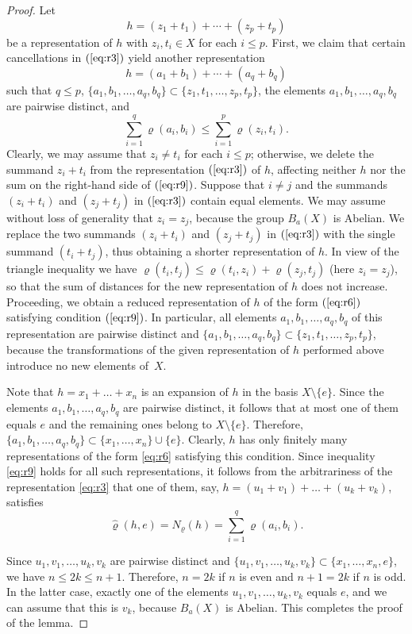 \documentclass[a4paper,12pt]{amsart}
\def\sub{\subset}
\theoremstyle{definition}
\begin{document}
\begin{proof}
Let 
\begin{equation}
\label{eq:r3}
h = (z_1+t_1) + \cdots + (z_p+t_p)
\end{equation}
be a representation of $h$ with $z_i,t_i\in X$ for each $i\leq p$.
First, we claim that certain cancellations in $(\ref{eq:r3})$ yield another 
representation 
\begin{equation}
\label{eq:r6}
h = (a_1+b_1) + \cdots + (a_q+b_q)
\end{equation}
such that $q\leq p$, $\{a_1,b_1,\ldots,a_q,b_q\}\sub 
\{z_1,t_1,\ldots,z_p,t_p\}$, the elements $a_1,b_1,\ldots,a_q,b_q$
are pairwise distinct, and 
\begin{equation}
\label{eq:r9}
\sum_{i=1}^q \varrho(a_i,b_i)\leq 
\sum_{i=1}^p \varrho(z_i,t_i).
\end{equation}
Clearly, we may assume that $z_i\neq t_i$ for each $i\leq p$; otherwise,
we delete the summand $z_i+t_i$ from the representation $(\ref{eq:r3})$
of $h$, affecting neither $h$ nor the sum on the right-hand side of 
$(\ref{eq:r9})$. Suppose that $i\ne j$ and the summands $(z_i+t_i)$
and $(z_j+t_j)$ in $(\ref{eq:r3})$ contain equal elements. We may assume 
without loss of generality that $z_i=z_j$, because the group $B_a(X)$ is 
Abelian. We replace the two summands $(z_i+t_i)$ and $(z_j+t_j)$ in 
$(\ref{eq:r3})$ with the single summand $(t_i+t_j)$, thus obtaining a shorter 
representation of $h$. In view of the triangle inequality we have 
$\varrho(t_i,t_j)\leq \varrho(t_i,z_i) + \varrho(z_j,t_j)$ (here $z_i=z_j$), 
so that the sum of distances for the new representation of $h$ does not 
increase. Proceeding, we obtain a reduced representation of $h$ of the form 
$(\ref{eq:r6})$ satisfying condition $(\ref{eq:r9})$. In particular, all 
elements $a_1,b_1,\ldots,a_q,b_q$ of this representation are pairwise 
distinct and $\{a_1,b_1,\ldots,a_q,b_q\}\sub \{z_1,t_1,\ldots,z_p,t_p\}$, 
because the transformations of the given representation of $h$ performed above 
introduce no new elements of~$X$.

Note that $h=x_1+\dots+x_n$ is an expansion of $h$ in the basis $X\setminus 
\{e\}$. Since the elements $a_1,b_1,\ldots,a_q,b_q$ are 
pairwise distinct, it follows that at most one of them equals $e$ and 
the remaining ones belong to $X\setminus \{e\}$. 
Therefore, $\{a_1,b_1,\ldots,a_q,b_q\}\subset \{x_1,\dots, x_n\}\cup\{e\}$.  
Clearly, $h$ has only finitely many representations of the form \eqref{eq:r6} 
satisfying this condition. Since inequality \eqref{eq:r9} holds for all such 
representations, it follows from the arbitrariness of the representation 
\eqref{eq:r3}  that one of them, say, $h = (u_1+v_1)+\dots+ (u_k+v_k)$, 
satisfies
$$ 
\widehat{\varrho}(h,e) =N_\varrho(h)=\sum_{i=1}^q \varrho(a_i,b_i). 
$$


Since $u_1,v_1,\ldots,u_k,v_k$ are pairwise distinct
and $\{u_1,v_1,\ldots,u_k,v_k\}\sub\{x_1,\ldots,x_n,e\}$, we have $n\leq 2k\leq 
n+1$. Therefore, $n=2k$ if $n$ is even and $n+1=2k$ if $n$ is odd. In the 
latter case, exactly one of the elements 
$u_1,v_1,\ldots,u_k,v_k$ equals $e$, and we can assume that this is $v_k$, 
because $B_a(X)$ is Abelian. This completes the proof of the lemma. 
\end{proof}
\end{document}

